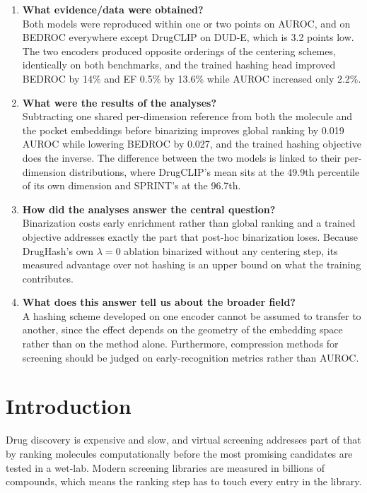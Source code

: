 \documentclass[10pt,a4paper]{article}
\begin{document}
\begin{enumerate}[leftmargin=*]
\item \textbf{What evidence/data were obtained?}\\
Both models were reproduced within one or two points on AUROC, and on BEDROC everywhere except
DrugCLIP on DUD-E, which is 3.2 points low. The
two encoders produced opposite orderings of the centering schemes, identically on both
benchmarks, and the trained hashing head improved BEDROC by 14\% and EF 0.5\% by 13.6\% while
AUROC increased only 2.2\%.

\item \textbf{What were the results of the analyses?}\\
Subtracting one shared per-dimension reference from both the molecule and the pocket
embeddings before binarizing improves global ranking by 0.019 AUROC while lowering BEDROC by
0.027, and the trained hashing objective does the inverse. The difference between the two
models is linked to their per-dimension distributions, where DrugCLIP's mean sits at the
49.9th percentile of its own dimension and SPRINT's at the 96.7th.

\item \textbf{How did the analyses answer the central question?}\\
Binarization costs early enrichment rather than global ranking and a trained objective
addresses exactly the part that post-hoc binarization loses. Because DrugHash's own
$\lambda = 0$ ablation binarized without any centering step, its measured advantage over not
hashing is an upper bound on what the training contributes.

\item \textbf{What does this answer tell us about the broader field?}\\
A hashing scheme developed on one encoder cannot be assumed to transfer to another, since the
effect depends on the geometry of the embedding space rather than on the method alone.
Furthermore, compression methods for screening should be judged on early-recognition metrics
rather than AUROC.
\end{enumerate}

\section{Introduction}\label{sec:intro}

Drug discovery is expensive and slow, and virtual screening addresses part of that by ranking
molecules computationally before the most promising candidates are tested in a wet-lab. Modern
screening libraries are measured in billions of compounds, which means the ranking step has to
touch every entry in the library.
\end{document}
